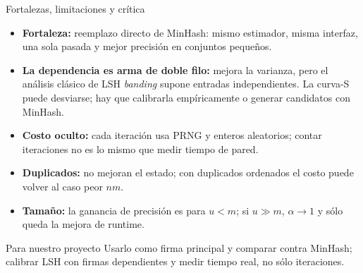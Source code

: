 \documentclass[aspectratio=169,11pt]{beamer}
\begin{document}
\begin{frame}{Fortalezas, limitaciones y cr\'itica}
  \begin{itemize}
    \item \textbf{Fortaleza:} reemplazo directo de MinHash: mismo estimador,
          misma interfaz, una sola pasada y mejor precisi\'on en conjuntos
          peque\~nos.
    \item \textbf{La dependencia es arma de doble filo:} mejora la varianza,
          pero el an\'alisis cl\'asico de LSH \emph{banding} supone entradas
          independientes. La curva-S puede desviarse; hay que calibrarla
          emp\'iricamente o generar candidatos con MinHash.
    \item \textbf{Costo oculto:} cada iteraci\'on usa PRNG y enteros aleatorios;
          contar iteraciones no es lo mismo que medir tiempo de pared.
    \item \textbf{Duplicados:} no mejoran el estado; con duplicados ordenados
          el costo puede volver al caso peor $nm$.
    \item \textbf{Tama\~no:} la ganancia de precisi\'on es para $u<m$; si
          $u\gg m$, $\alpha\to1$ y s\'olo queda la mejora de runtime.
  \end{itemize}
  \vfill
  \begin{block}{Para nuestro proyecto}
    \small
    Usarlo como firma principal y comparar contra MinHash; calibrar LSH con
    firmas dependientes y medir tiempo real, no s\'olo iteraciones.
  \end{block}
\end{frame}
\end{document}
